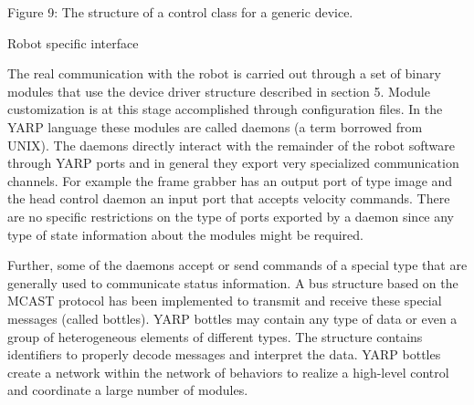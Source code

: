 Figure 9: The structure of a control class for a generic device.

Robot specific interface

The real communication with the robot is carried out through a set of
binary modules that use the device driver structure described in
section 5. Module customization is at this stage accomplished through
configuration files. In the YARP language these modules are called
daemons (a term borrowed from UNIX). The daemons directly interact
with the remainder of the robot software through YARP ports and in
general they export very specialized communication channels. For
example the frame grabber has an output port of type image and the
head control daemon an input port that accepts velocity
commands. There are no specific restrictions on the type of ports
exported by a daemon since any type of state information about the
modules might be required.

Further, some of the daemons accept or send commands of a special type
that are generally used to communicate status information. A bus
structure based on the MCAST protocol has been implemented to transmit
and receive these special messages (called bottles). YARP bottles may
contain any type of data or even a group of heterogeneous elements of
different types. The structure contains identifiers to properly decode
messages and interpret the data. YARP bottles create a network within
the network of behaviors to realize a high-level control and
coordinate a large number of modules.


